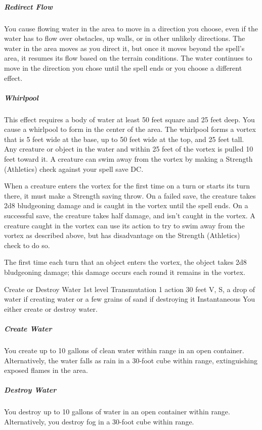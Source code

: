 \documentclass[10pt,a4paper,twoside,bg=print,twocolumn,openany,nodeprecatedcode]{dndbook}
\begin{document}
\subparagraph{Redirect Flow}
You cause flowing water in the area to move in a direction you choose, even if the water has to flow over obstacles, up walls, or in other unlikely directions. The water in the area moves as you direct it, but once it moves beyond the spell's area, it resumes its flow based on the terrain conditions. The water continues to move in the direction you chose until the spell ends or you choose a different effect.

\subparagraph{Whirlpool}
This effect requires a body of water at least 50 feet square and 25 feet deep. You cause a whirlpool to form in the center of the area. The whirlpool forms a vortex that is 5 feet wide at the base, up to 50 feet wide at the top, and 25 feet tall. Any creature or object in the water and within 25 feet of the vortex is pulled 10 feet toward it. A creature can swim away from the vortex by making a Strength (Athletics) check against your spell save DC.

When a creature enters the vortex for the first time on a turn or starts its turn there, it must make a Strength saving throw. On a failed save, the creature takes 2d8 bludgeoning damage and is caught in the vortex until the spell ends. On a successful save, the creature takes half damage, and isn't caught in the vortex. A creature caught in the vortex can use its action to try to swim away from the vortex as described above, but has disadvantage on the Strength (Athletics) check to do so.

The first time each turn that an object enters the vortex, the object takes 2d8 bludgeoning damage; this damage occurs each round it remains in the vortex.



\DndSpellHeader%
{Create or Destroy Water}
{1st level Transmutation}
{1 action}
{30 feet}
{V, S, a drop of water if creating water or a few grains of sand if destroying it}
{Instantaneous}
You either create or destroy water.

\subparagraph{Create Water}
You create up to 10 gallons of clean water within range in an open container. Alternatively, the water falls as rain in a 30-foot cube within range, extinguishing exposed flames in the area.

\subparagraph{Destroy Water}
You destroy up to 10 gallons of water in an open container within range. Alternatively, you destroy fog in a 30-foot cube within range.

\end{document}
